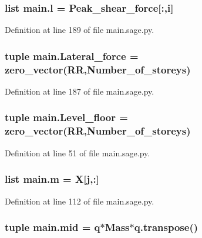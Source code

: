 \subsubsection[{l}]{\setlength{\rightskip}{0pt plus 5cm}list main.\+l = {\bf Peak\+\_\+shear\+\_\+force}\mbox{[}\+:,{\bf i}\mbox{]}}\label{namespacemain_a027916efc284622d928c1d8383917f6d}


Definition at line 189 of file main.\+sage.\+py.

\hypertarget{namespacemain_a8d395a4120126cf1de1d3f04b1fc3457}{}
\subsubsection[{Lateral\+\_\+force}]{\setlength{\rightskip}{0pt plus 5cm}tuple main.\+Lateral\+\_\+force = zero\+\_\+vector(R\+R,Number\+\_\+of\+\_\+storeys)}\label{namespacemain_a8d395a4120126cf1de1d3f04b1fc3457}


Definition at line 187 of file main.\+sage.\+py.

\hypertarget{namespacemain_aa6efadb1dc89cc9d5b75113b025fe962}{}
\subsubsection[{Level\+\_\+floor}]{\setlength{\rightskip}{0pt plus 5cm}tuple main.\+Level\+\_\+floor = zero\+\_\+vector(R\+R,Number\+\_\+of\+\_\+storeys)}\label{namespacemain_aa6efadb1dc89cc9d5b75113b025fe962}


Definition at line 51 of file main.\+sage.\+py.

\hypertarget{namespacemain_af6e3698b7f50fc004eb759d7c447fdb3}{}
\subsubsection[{m}]{\setlength{\rightskip}{0pt plus 5cm}list main.\+m = {\bf X}\mbox{[}{\bf j},\+:\mbox{]}}\label{namespacemain_af6e3698b7f50fc004eb759d7c447fdb3}


Definition at line 112 of file main.\+sage.\+py.

\hypertarget{namespacemain_a70551c7fc78da8fdec83fe500056d388}{}
\subsubsection[{mid}]{\setlength{\rightskip}{0pt plus 5cm}tuple main.\+mid = {\bf q}$\ast$Mass$\ast$q.\+transpose()}\label{namespacemain_a70551c7fc78da8fdec83fe500056d388}



